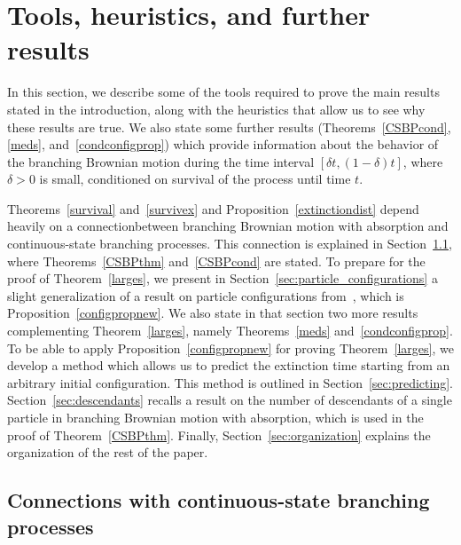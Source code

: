 \documentclass[10pt]{amsart}
\theoremstyle{definition}\newtheorem{defi}[theo]{Definition}\newtheorem{rema}[theo]{Remark}\newtheorem{exam}[theo]{Example}\newtheorem{exem}[theo]{Example}\newtheorem{nota}[theo]{Notation}
\newcommand{\1} {\mathds{1}}
\begin{document}
\section{Tools, heuristics, and further results}

In this section, we describe some of the tools required to prove the main results stated in the introduction, along with the heuristics that allow us to see why these results are true. We also state some further results (Theorems~\ref{CSBPcond}, \ref{meds}, and~\ref{condconfigprop}) which provide information about the behavior of the branching Brownian motion during the time interval $[\delta t, (1 - \delta)t]$, where $\delta > 0$ is small, conditioned on survival of the process until time $t$.

Theorems~\ref{survival} and~\ref{survivex} and Proposition~\ref{extinctiondist} depend heavily on a connection\linebreak between branching Brownian motion with absorption and continuous-state branching processes. This connection is explained in Section~\ref{CSBPintro}, where Theorems~\ref{CSBPthm} and~\ref{CSBPcond} are stated. To prepare for the proof of Theorem~\ref{larges}, we present in Section~\ref{sec:particle_configurations} a slight generalization of a result on particle configurations from~\cite{bbs3}, which is Proposition~\ref{configpropnew}. We also state in that section two more results complementing Theorem~\ref{larges}, namely Theorems~\ref{meds} and~\ref{condconfigprop}. To be able to apply Proposition~\ref{configpropnew} for proving Theorem~\ref{larges}, we develop a method which allows us to predict the extinction time starting from an arbitrary initial configuration. This method is outlined in Section~\ref{sec:predicting}. Section~\ref{sec:descendants} recalls a result on the number of descendants of a single particle in branching Brownian motion with absorption, which is used in the proof of Theorem~\ref{CSBPthm}. Finally, Section~\ref{sec:organization} explains the organization of the rest of the paper.

\subsection{Connections with continuous-state branching processes}\label{CSBPintro}
\end{document}
